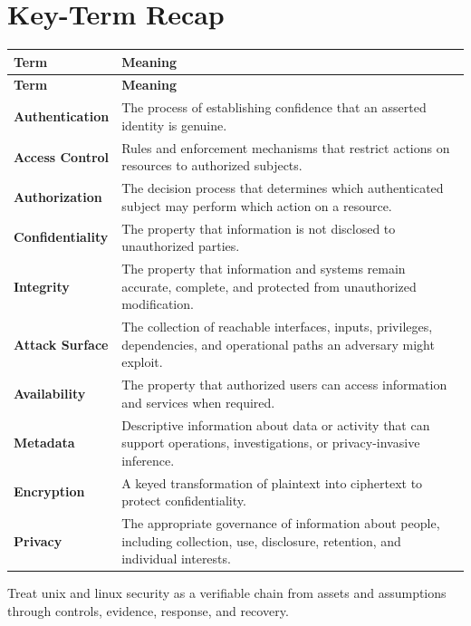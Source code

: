 \documentclass[11pt]{article}
\begin{document}
\section*{Key-Term Recap}
\begin{longtable}{>{\RaggedRight\arraybackslash}p{}>{\RaggedRight\arraybackslash}p{}}
\toprule\rowcolor{Navy}\color{white}\textbf{Term} & \color{white}\textbf{Meaning}\\\midrule
\endfirsthead
\toprule\rowcolor{Navy}\color{white}\textbf{Term} & \color{white}\textbf{Meaning}\\\midrule
\endhead
\textbf{Authentication} & The process of establishing confidence that an asserted identity is genuine. \\\midrule
\textbf{Access Control} & Rules and enforcement mechanisms that restrict actions on resources to authorized subjects. \\\midrule
\textbf{Authorization} & The decision process that determines which authenticated subject may perform which action on a resource. \\\midrule
\textbf{Confidentiality} & The property that information is not disclosed to unauthorized parties. \\\midrule
\textbf{Integrity} & The property that information and systems remain accurate, complete, and protected from unauthorized modification. \\\midrule
\textbf{Attack Surface} & The collection of reachable interfaces, inputs, privileges, dependencies, and operational paths an adversary might exploit. \\\midrule
\textbf{Availability} & The property that authorized users can access information and services when required. \\\midrule
\textbf{Metadata} & Descriptive information about data or activity that can support operations, investigations, or privacy-invasive inference. \\\midrule
\textbf{Encryption} & A keyed transformation of plaintext into ciphertext to protect confidentiality. \\\midrule
\textbf{Privacy} & The appropriate governance of information about people, including collection, use, disclosure, retention, and individual interests. \\\midrule
\bottomrule
\end{longtable}
\begin{takeawaybox}
Treat unix and linux security as a verifiable chain from assets and assumptions through controls, evidence, response, and recovery.
\end{takeawaybox}
\end{document}
